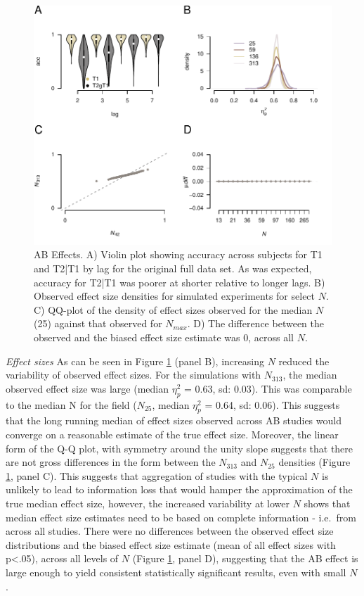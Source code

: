 \documentclass{article}
\begin{document}
\begin{figure}

{\centering \includegraphics[width=0.8\linewidth]{../images/IMMAB_fx_main} 

}

\caption{AB Effects. A) Violin plot showing accuracy across subjects for T1 and T2|T1 by lag for the original full data set. As was expected, accuracy for T2|T1 was poorer at shorter relative to longer lags. B) Observed effect size densities for simulated experiments for select $N$. C) QQ-plot of the density of effect sizes observed for the median $N$ (25) against that observed for $N_{max}$. D) The difference between the observed and the biased effect size estimate was 0, across all $N$.}\label{fig:ABFX}
\end{figure}

\emph{Effect sizes} As can be seen in Figure \ref{fig:ABFX} (panel B), increasing \(N\) reduced the variability of observed effect sizes. For the simulations with \(N_{313}\), the median observed effect size was large (median \(\eta_{p}^2\) = 0.63, sd: 0.03). This was comparable to the median N for the field (\(N_{25}\), median \(\eta_{p}^2\) = 0.64, sd: 0.06). This suggests that the long running median of effect sizes observed across AB studies would converge on a reasonable estimate of the true effect size. Moreover, the linear form of the Q-Q plot, with symmetry around the unity slope suggests that there are not gross differences in the form between the \(N_{313}\) and \(N_{25}\) densities (Figure \ref{fig:ABFX}, panel C). This suggests that aggregation of studies with the typical \(N\) is unlikely to lead to information loss that would hamper the approximation of the true median effect size, however, the increased variability at lower \(N\) shows that median effect size estimates need to be based on complete information - i.e.~from across all studies. There were no differences between the observed effect size distributions and the biased effect size estimate (mean of all effect sizes with p\textless.05), across all levels of \(N\) (Figure \ref{fig:ABFX}, panel D), suggesting that the AB effect is large enough to yield consistent statistically significant results, even with small \(N\).
\end{document}
